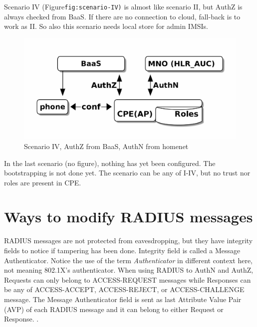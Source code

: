 \documentclass[12pt,a4paper,english]{tutthesis}
\begin{document}
\label{scenario-iv} 


Scenario IV (Figure\texttt{fig:scenario-IV)} is almost like scenario II, but
AuthZ is always checked from BaaS. If there are no connection to
cloud, fall-back is to work as II. So also this scenario needs local
store for admin IMSIs.

\begin{figure}[htb]
\centering
\includegraphics[width=.9\linewidth]{scenIV.png}
\caption{\label{fig:scenario-IV}Scenario IV, AuthZ from BaaS, AuthN from homenet}
\end{figure}

In the last scenario (no figure), nothing has yet been configured. The bootstrapping
is not done yet. The scenario can be any of I-IV, but no trust nor roles are present in CPE.
\section{Ways to modify RADIUS messages}
\label{sec-4-6}
\label{sec:radius-macs}
RADIUS messages are not protected from eavesdropping, but they have
integrity fields to notice if tampering has been done.  
Integrity field is called a Message Authenticator.
Notice the use of the term \emph{Authenticator} in different context here, not
meaning 802.1X's authenticator.
When using RADIUS to AuthN and AuthZ, Requests can only belong to ACCESS-REQUEST messages while
Responses can be any of ACCESS-ACCEPT, ACCESS-REJECT, or ACCESS-CHALLENGE message.
The Message Authenticator field is sent as last Attribute Value Pair (AVP)
of each RADIUS message and it can belong 
to either Request or Response. \cite[p.20]{radiusbook}.
\end{document}
